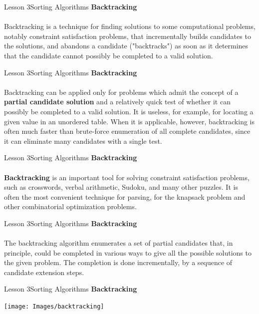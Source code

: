 \documentclass[aspectratio=1610]{beamer}
\begin{document}
\begin{frame}{Lesson 3}{Sorting Algorithms}
\LARGE
\textbf{Backtracking}\\~\\
\Large
Backtracking is a technique for finding solutions to some
computational problems, notably constraint satisfaction problems,
that incrementally builds candidates to the solutions, and abandons a
candidate ("backtracks") as soon as it determines that the candidate
cannot possibly be completed to a valid solution.
\end{frame}


\begin{frame}{Lesson 3}{Sorting Algorithms}
\LARGE
\textbf{Backtracking}\\~\\
\Large
Backtracking can be applied only for problems which admit the concept 
of a \textbf{partial candidate solution} and a relatively quick test 
of whether it can possibly be completed to a valid solution. It is 
useless, for example, for locating a given value in an unordered 
table. When it is applicable, however, backtracking is often much 
faster than brute-force enumeration of all complete candidates, since 
it can eliminate many candidates with a single test.
\end{frame}



\begin{frame}{Lesson 3}{Sorting Algorithms}
\LARGE
\textbf{Backtracking}\\~\\
\Large
\textbf{Backtracking} is an important tool for solving constraint 
satisfaction problems, such as crosswords, verbal arithmetic, Sudoku,
and many other puzzles. It is often the most convenient technique for
parsing, for the knapsack problem and other combinatorial
optimization problems.
\end{frame}


\begin{frame}{Lesson 3}{Sorting Algorithms}
\LARGE
\textbf{Backtracking}\\~\\
\Large
The backtracking algorithm enumerates a set of partial candidates 
that, in principle, could be completed in various ways to give all 
the possible solutions to the given problem. The completion is done 
incrementally, by a sequence of candidate extension steps.
\end{frame}


\begin{frame}{Lesson 3}{Sorting Algorithms}
\LARGE
\textbf{Backtracking}\\
\begin{center}
\texttt{[image: Images/backtracking]}
\end{center}
\end{frame}
\end{document}
